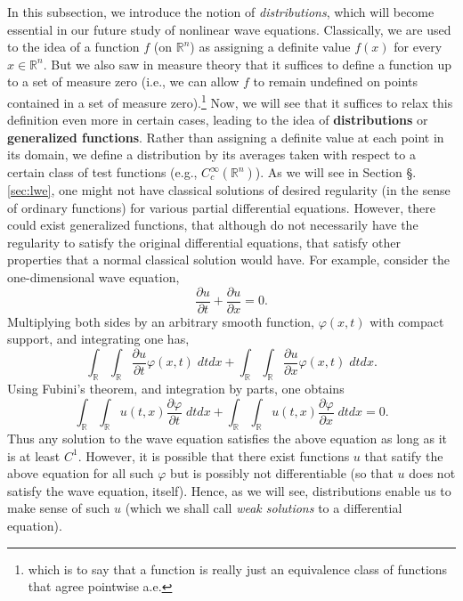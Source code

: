 \documentclass{article}
\begin{document}
In this subsection, we introduce the notion of \textit{distributions}, which will become essential in our future study of nonlinear wave equations. Classically, we are used to the idea of a function $f$ (on $\mathbb{R}^{n}$) as assigning a definite value $f(x)$ for every $x \in \mathbb{R}^{n}$. But we also saw in measure theory that it suffices to define a function up to a set of measure zero (i.e., we can allow $f$ to remain undefined on points contained in a set of measure zero).\footnote{which is to say that a function is really just an equivalence class of functions that agree pointwise a.e.} Now, we will see that it suffices to relax this definition even more in certain cases, leading to the idea of \textbf{distributions} or \textbf{generalized functions}. Rather than assigning a definite value at each point in its domain, we define a distribution by its averages taken with respect to a certain class of test functions (e.g., $C_{c}^{\infty}(\mathbb{R}^{n})$). As we will see in Section \S.\ref{sec:lwe}, one might not have classical solutions of desired regularity (in the sense of ordinary functions) for various partial differential equations. However, there could exist generalized functions, that although do not necessarily have the regularity to satisfy the original differential equations, that satisfy other properties that a normal classical solution would have. For example, consider the one-dimensional wave equation, 
\begin{equation*}
	\frac{\partial u}{\partial t} + \frac{\partial u}{\partial x} = 0.  
\end{equation*}
Multiplying both sides by an arbitrary smooth function, $\varphi(x,t)$ with compact support, and integrating one has, 
\begin{equation*}
	\int_{\mathbb{R}}\int_{\mathbb{R}}\frac{\partial u}{\partial t}\varphi(x, t)\;dtdx + \int_{\mathbb{R}}\int_{\mathbb{R}}\frac{\partial u}{\partial x}\varphi(x, t)\;dtdx. 
\end{equation*}
Using Fubini's theorem, and integration by parts, one obtains 
\begin{equation*}
	\int_{\mathbb{R}}\int_{\mathbb{R}}u(t, x) \frac{\partial \varphi}{\partial t}\;dtdx + \int_{\mathbb{R}}\int_{\mathbb{R}}u(t, x)\frac{\partial \varphi}{\partial x}\;dtdx = 0. 
\end{equation*}
Thus any solution to the wave equation satisfies the above equation as long as it is at least $C^{1}$. However, it is possible that there exist functions $u$ that satify the above equation for all such $\varphi$ but is possibly not differentiable (so that $u$ does not satisfy the wave equation, itself). Hence, as we will see, distributions enable us to make sense of such $u$ (which we shall call \textit{weak solutions} to a differential equation). 
\end{document}
